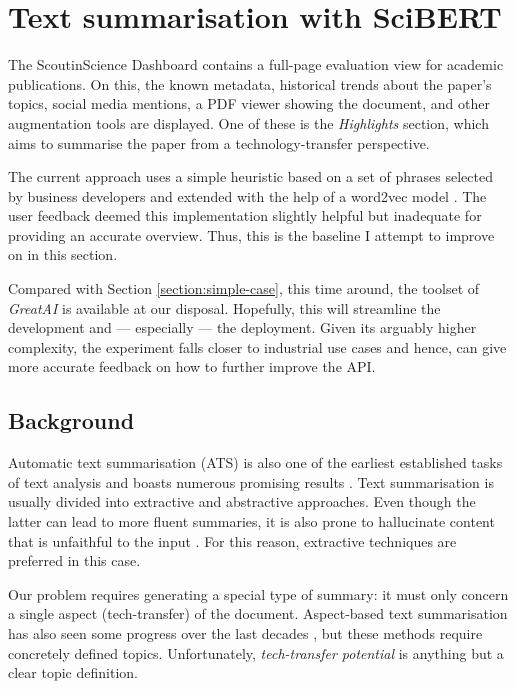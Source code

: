 \section{Text summarisation with SciBERT} \label{section:complex-case}

The ScoutinScience Dashboard contains a full-page evaluation view for academic publications. On this, the known metadata, historical trends about the paper's topics, social media mentions, a PDF viewer showing the document, and other augmentation tools are displayed. One of these is the \textit{Highlights} section, which aims to summarise the paper from a technology-transfer perspective.

The current approach uses a simple heuristic based on a set of phrases selected by business developers and extended with the help of a word2vec model \cite{mikolov2013efficient}. The user feedback deemed this implementation slightly helpful but inadequate for providing an accurate overview. Thus, this is the baseline I attempt to improve on in this section.

\begin{displayquote}
Compared with Section \ref{section:simple-case}, this time around, the toolset of \textit{GreatAI} is available at our disposal. Hopefully, this will streamline the development and --- especially --- the deployment. Given its arguably higher complexity, the experiment falls closer to industrial use cases and hence, can give more accurate feedback on how to further improve the API.
\end{displayquote}

\subsection{Background}

Automatic text summarisation (ATS) is also one of the earliest established tasks of text analysis and boasts numerous promising results \cite{el2021automatic}. Text summarisation is usually divided into extractive and abstractive approaches. Even though the latter can lead to more fluent summaries, it is also prone to hallucinate content that is unfaithful to the input \cite{maynez2020faithfulness}. For this reason, extractive techniques are preferred in this case.

Our problem requires generating a special type of summary: it must only concern a single aspect (tech-transfer) of the document. Aspect-based text summarisation has also seen some progress over the last decades \cite{berkovsky2008aspect,hayashi2021wikiasp}, but these methods require concretely defined topics. Unfortunately, \textit{tech-transfer potential} is anything but a clear topic definition.

